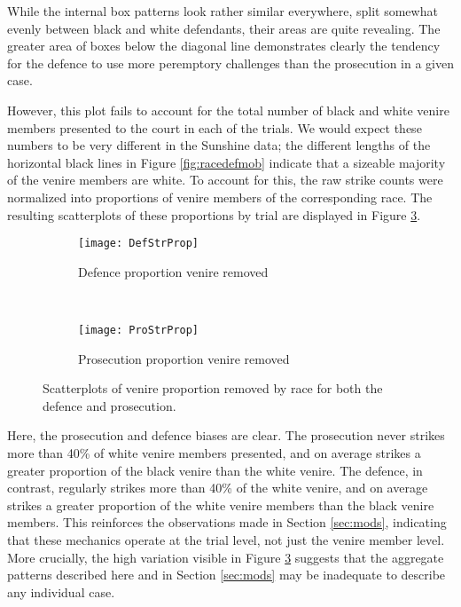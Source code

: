 While the internal box patterns look rather similar everywhere, split somewhat evenly between black and white defendants,
their areas are quite revealing. The greater area of boxes below the diagonal line demonstrates clearly the tendency for the defence to use more peremptory challenges than the prosecution in a given case.

However, this plot fails to account for
the total number of black and white venire members presented to the
court in each of the trials. We would expect these numbers to be very
different in the Sunshine data; the different lengths of the
horizontal black lines in Figure \ref{fig:racedefmob} indicate that a
sizeable majority of the venire members are white. To account for
this, the raw strike counts were normalized into proportions of venire
members of the corresponding race. The resulting scatterplots
of these proportions by trial are displayed in Figure \ref{fig:defproprop}.

\begin{figure}[h!]
  \centering
  \begin{subfigure}{0.45\textwidth}
    \texttt{[image: DefStrProp]}
    \caption{\footnotesize Defence proportion venire removed}
    \label{fig:defraceprop}
  \end{subfigure}
  ~
  \begin{subfigure}{0.45\textwidth}
    \texttt{[image: ProStrProp]}
    \caption{\footnotesize Prosecution proportion venire removed}
    \label{fig:proraceprop}
  \end{subfigure}
  \caption[Racial Strike Proportions by Party]
  {\footnotesize Scatterplots of venire proportion removed by race for both the defence and prosecution.}
  \label{fig:defproprop}
\end{figure}

Here, the prosecution and defence biases are clear. The prosecution never strikes more than 40\% of white venire members
presented, and on average strikes a greater proportion of the black venire than the white venire. The defence, in contrast,
regularly strikes more than 40\% of the white venire, and on average strikes a greater proportion of the white venire members than
the black venire members. This reinforces the observations made in Section \ref{sec:mods}, indicating that these mechanics
operate at the trial level, not just the venire member level. More crucially, the high variation visible in Figure
\ref{fig:defproprop} suggests that the aggregate patterns described
here and in Section \ref{sec:mods} may be inadequate to describe any individual case.

